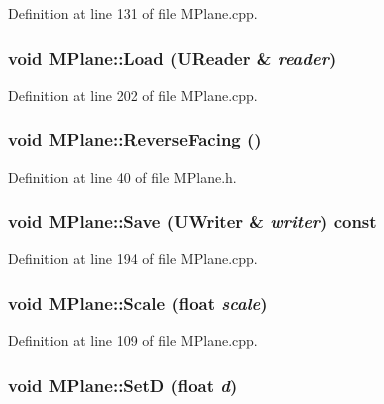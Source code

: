 Definition at line 131 of file MPlane.cpp.\hypertarget{class_m_plane_8e7c1820f2a4e745b85e011a90cfe0f8}{
\subsubsection[{Load}]{\setlength{\rightskip}{0pt plus 5cm}void MPlane::Load ({\bf UReader} \& {\em reader})}}
\label{class_m_plane_8e7c1820f2a4e745b85e011a90cfe0f8}




Definition at line 202 of file MPlane.cpp.\hypertarget{class_m_plane_8fc4ab464ff88f145337b33e8c3d3dd0}{
\subsubsection[{ReverseFacing}]{\setlength{\rightskip}{0pt plus 5cm}void MPlane::ReverseFacing ()}}
\label{class_m_plane_8fc4ab464ff88f145337b33e8c3d3dd0}




Definition at line 40 of file MPlane.h.\hypertarget{class_m_plane_67c49a180eb1c4366b074dfee7931dad}{
\subsubsection[{Save}]{\setlength{\rightskip}{0pt plus 5cm}void MPlane::Save ({\bf UWriter} \& {\em writer}) const}}
\label{class_m_plane_67c49a180eb1c4366b074dfee7931dad}




Definition at line 194 of file MPlane.cpp.\hypertarget{class_m_plane_3a92f3bce040b707ba855c0f797b56d2}{
\subsubsection[{Scale}]{\setlength{\rightskip}{0pt plus 5cm}void MPlane::Scale (float {\em scale})}}
\label{class_m_plane_3a92f3bce040b707ba855c0f797b56d2}




Definition at line 109 of file MPlane.cpp.\hypertarget{class_m_plane_504ba7ba959fbbdcfc13bda9a3c59fff}{
\subsubsection[{SetD}]{\setlength{\rightskip}{0pt plus 5cm}void MPlane::SetD (float {\em d})}}
\label{class_m_plane_504ba7ba959fbbdcfc13bda9a3c59fff}




